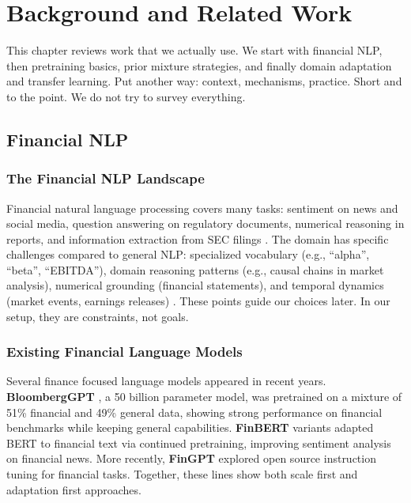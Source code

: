 \chapter{Background and Related Work}

This chapter reviews work that we actually use. We start with financial NLP, then pretraining basics, prior mixture strategies, and finally domain adaptation and transfer learning. Put another way: context, mechanisms, practice. Short and to the point. We do not try to survey everything.

\section{Financial NLP}

\subsection{The Financial NLP Landscape}

Financial natural language processing covers many tasks: sentiment on news and social media, question answering on regulatory documents, numerical reasoning in reports, and information extraction from SEC filings \parencite{araci2019finbert, chen2021finqa}. The domain has specific challenges compared to general NLP: specialized vocabulary (e.g., ``alpha'', ``beta'', ``EBITDA''), domain reasoning patterns (e.g., causal chains in market analysis), numerical grounding (financial statements), and temporal dynamics (market events, earnings releases) \parencite{wu2023bloomberggpt, araci2019finbert}. These points guide our choices later. In our setup, they are constraints, not goals.

\subsection{Existing Financial Language Models}

Several finance focused language models appeared in recent years. \textbf{BloombergGPT} \parencite{wu2023bloomberggpt}, a 50 billion parameter model, was pretrained on a mixture of 51\% financial and 49\% general data, showing strong performance on financial benchmarks while keeping general capabilities. \textbf{FinBERT} variants \parencite{araci2019finbert, yang2020finbert} adapted BERT to financial text via continued pretraining, improving sentiment analysis on financial news. More recently, \textbf{FinGPT} \parencite{yang2023fingpt} explored open source instruction tuning for financial tasks. Together, these lines show both scale first and adaptation first approaches.

